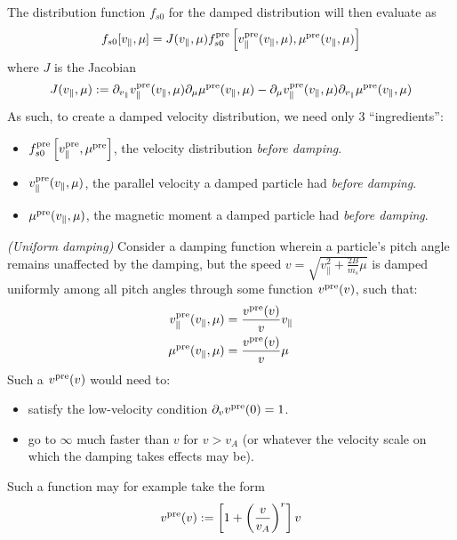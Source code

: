     The distribution function $f_{s0}$ for the damped distribution will then evaluate as
    \begin{equation}
        f_{s0}[v_{\parallel}, \mu]  =  J(v_{\parallel}, \mu)f_{s0}^{\rm pre}\left[v_{\parallel}^{\rm pre}(v_{\parallel}, \mu), \mu^{\rm pre}(v_{\parallel}, \mu)\right]
    \end{equation}
    where $J$ is the Jacobian
    \begin{equation}
        J(v_{\parallel}, \mu)  :=  \partial_{v_{\parallel}}v_{\parallel}^{\rm pre}(v_{\parallel}, \mu)\partial_{\mu}\mu^{\rm pre}(v_{\parallel}, \mu) - \partial_{\mu}v_{\parallel}^{\rm pre}(v_{\parallel}, \mu)\partial_{v_{\parallel}}\mu^{\rm pre}(v_{\parallel}, \mu)
    \end{equation}
    As such, to create a damped velocity distribution, we need only 3 ``ingredients'':
    \begin{itemize}
        \item  $f_{s0}^{\rm pre}\left[v_{\parallel}^{\rm pre}, \mu^{\rm pre}\right]$, the velocity distribution \emph{before damping}.
        \item  $v_{\parallel}^{\rm pre}(v_{\parallel}, \mu)$, the parallel velocity a damped particle had \emph{before damping}.
        \item  $\mu^{\rm pre}(v_{\parallel}, \mu)$, the magnetic moment a damped particle had \emph{before damping}.
    \end{itemize}

    \begin{example}{\emph{(Uniform damping)}}
        Consider a damping function wherein a particle's pitch angle remains unaffected by the damping, but the speed $v = \sqrt{v_{\parallel}^{2} + \frac{2B}{m_{s}}\mu}$ is damped uniformly among all pitch angles through some function $v^{\rm pre}(v)$, such that:
        \begin{align}
           v_{\parallel}^{\rm pre}(v_{\parallel}, \mu)  &=  \frac{v^{\rm pre}(v)}{v}v_{\parallel}  \\
           \mu^{\rm pre}(v_{\parallel}, \mu)  &=  \frac{v^{\rm pre}(v)}{v}\mu
        \end{align}
        Such a $v^{\rm pre}(v)$ would need to:
        \begin{itemize}
            \item  satisfy the low-velocity condition $\partial_{v}v^{\rm pre}(0) = 1$.
            \item  go to $\infty$ much faster than $v$ for $v > v_{A}$ (or whatever the velocity scale on which the damping takes effects may be).
        \end{itemize}
        Such a function may for example take the form
        \begin{equation}
            v^{\rm pre}(v)  :=  \left[1 + \left(\frac{v}{v_{A}}\right)^{r}\right]v
        \end{equation}
    \end{example}
    